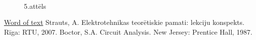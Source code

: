 \documentclass {report}
\begin{document}
\begin{figure}
\\
\caption{5.attēls}
\label{i:example}
\end{figure}
\begin{thebibliography}{9}
\hyperref[sec:Oma]{Word of text}
Strauts, A. Elektrotehnikas teorētiskie pamati: lekciju konspekts. Rīga: RTU, 2007. {\label{mans_id}}
Boctor, S.A. Circuit Analysis. New Jersey: Prentice Hall, 1987.
\end{thebibliography}
\end{document}
